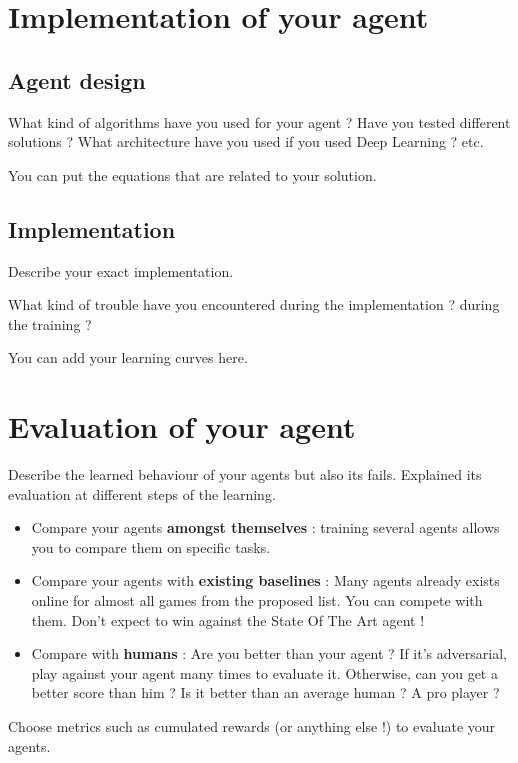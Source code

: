 \documentclass[letterpaper, 10 pt, conference]{ieeeconf}  %
\begin{document}
\section{Implementation of your agent}

\subsection{Agent design}

What kind of algorithms have you used for your agent ? Have you tested different solutions ? What architecture have you used if you used Deep Learning ? etc.

You can put the equations that are related to your solution.


\subsection{Implementation}

Describe your exact implementation.

What kind of trouble have you encountered during the implementation ? during the training ?

You can add your learning curves here.

\section{Evaluation of your agent}

Describe the learned behaviour of your agents but also its fails. Explained its evaluation at different steps of the learning.
\begin{itemize}
    \item Compare your agents \textbf{amongst themselves} : training several agents allows you to compare them on specific tasks.
    \item Compare your agents with \textbf{existing baselines} : Many agents already exists online for almost all games from the proposed list. You can compete with them. Don't expect to win against the State Of The Art agent !
    \item Compare with \textbf{humans} : Are you better than your agent ? If it's adversarial, play against your agent many times to evaluate it. Otherwise, can you get a better score than him ? Is it better than an average human ? A pro player ?
\end{itemize}{}

Choose metrics such as cumulated rewards (or anything else !) to evaluate your agents.
\end{document}
